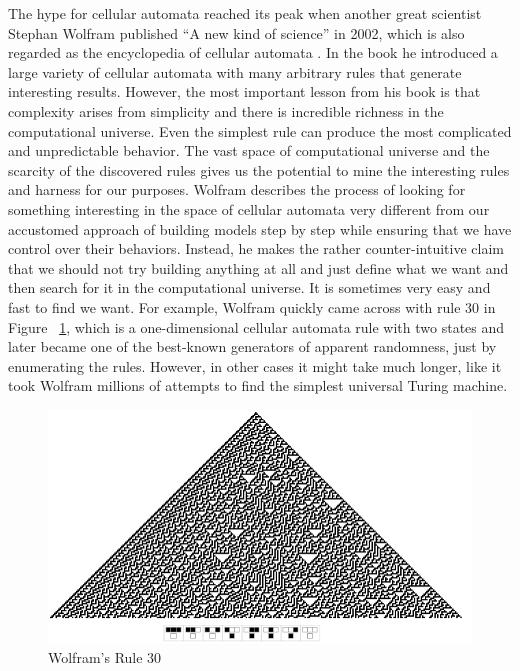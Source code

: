 \documentclass[12pt]{article}
\numberwithin{figure}{section} %
\begin{document}
The hype for cellular automata reached its peak when another great scientist Stephan Wolfram published “A new kind of science” in 2002, which is also regarded as the encyclopedia of cellular automata \cite{A new kind of Science}. In the book he introduced a large variety of cellular automata with many arbitrary rules that generate interesting results. However, the most important lesson from his book is that complexity arises from simplicity and there is incredible richness in the computational universe. Even the simplest rule can produce the most complicated and unpredictable behavior. The vast space of computational universe and the scarcity of the discovered rules gives us the potential to mine the interesting rules and harness for our purposes. Wolfram describes the process of looking for something interesting in the space of cellular automata very different from our accustomed approach of building models step by step while ensuring that we have control over their behaviors. Instead, he makes the rather counter-intuitive claim that we should not try building anything at all and just define what we want and then search for it in the computational universe. It is sometimes very easy and fast to find we want. For example, Wolfram quickly came across with rule 30 \cite{Rule 30} in Figure ~\ref{fig:Rule 30}, which is a one-dimensional cellular automata rule with two states and later became one of the best-known generators of apparent randomness, just by enumerating the rules. However, in other cases it might take much longer, like it took Wolfram millions of attempts to find the simplest universal Turing machine. 
 
\begin{figure}[H]
\includegraphics[width=\linewidth]{Section2/1}
\caption[Wolfram's Rule 30]{Wolfram’s Rule 30}
\vspace{-1.5em}
\label{fig:Rule 30}
\end{figure}
\end{document}
